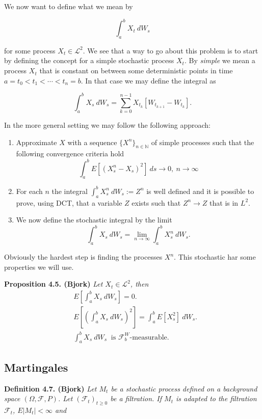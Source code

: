\documentclass[a4paper,12pt,openany]{book}
\providecommand{\tightlist}{%
 \setlength{\itemsep}{0pt}\setlength{\parskip}{0pt}}
\begin{document}
We now want to define what we mean by

\[
\int_a^bX_t\ dW_s
\]

for some process \(X_t\in\mathcal{L}^2\). We see that a way to go about this problem is to start by defining the concept for a simple stochastic process \(X_t\). By \emph{simple} we mean a process \(X_t\) that is constant on between some deterministic points in time \(a=t_0<t_1<\cdots<t_n=b\). In that case we may define the integral as

\[
\int_a^bX_s\ dW_s = \sum_{k=0}^{n-1}X_{t_k}[W_{t_{k+1}}-W_{t_k}].\tag{4.8}
\]

In the more general setting we may follow the following approach:

\begin{enumerate}
\def\labelenumi{\arabic{enumi}.}
\tightlist
\item
  Approximate \(X\) with a sequence \(\{X^n\}_{n\in\mathbb{N}}\) of simple processes such that the following convergence criteria hold
  \[
    \int_a^bE[(X_s^n-X_s)^2]\ ds\to 0,\ n\to\infty
    \]
\item
  For each \(n\) the integral \(\int_a^b X_s^n\ dW_s:=Z^n\) is well defined and it is possible to prove, using DCT, that a variable \(Z\) exists such that \(Z^n\to Z\) that is in \(L^2\).
\item
  We now define the stochastic integral by the limit
  \[
    \int_a^b X_s\ dW_s=\lim_{n\to \infty}\int_a^b X_s^n\ dW_s.\tag{4.9}
    \]
\end{enumerate}

Obviously the hardest step is finding the processes \(X^n\). This stochastic har some properties we will use.

\textbf{Proposition 4.5. (Bjork)} \emph{Let \(X_t\in\mathcal{L}^2\), then}
\begin{align*}
&E\left[\int_a^b X_s\ dW_s\right]=0.\tag{4.12}\\
&E\left[\left(\int_a^b X_s\ dW_s\right)^2\right]=\int_a^b E[ X_s^2]\ dW_s.\tag{4.13}\\
&\int_a^b X_s\ dW_s\ \text{ is }\mathcal{F}_b^W\text{-measurable.}\tag{4.14}
\end{align*}

\hypertarget{martingales}{%
\subsection{Martingales}\label{martingales}}

\textbf{Definition 4.7. (Bjork)} \emph{Let \(M_t\) be a stochastic process defined on a background space \((\Omega,\mathcal{F},P)\). Let \((\mathcal{F}_t)_{t\ge 0}\) be a filtration. If \(M_t\) is adapted to the filtration \(\mathcal{F}_t\), \(E\vert M_t\vert <\infty\) and}
\end{document}
